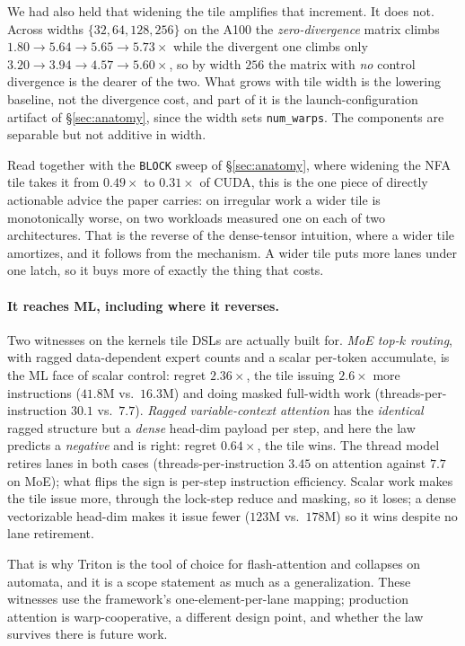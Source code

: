 \documentclass[sigplan,anonymous,review,nonacm,10pt]{acmart}
\begin{document}
We had also held that widening the tile amplifies that increment. It does not. Across
widths $\{32,64,128,256\}$ on the A100 the \emph{zero-divergence} matrix climbs
$1.80\rightarrow5.64\rightarrow5.65\rightarrow5.73\times$ while the divergent one climbs
only $3.20\rightarrow3.94\rightarrow4.57\rightarrow5.60\times$, so by width $256$ the
matrix with \emph{no} control divergence is the dearer of the two. What grows with tile
width is the lowering baseline, not the divergence cost, and part of it is the
launch-configuration artifact of \S\ref{sec:anatomy}, since the width sets
\texttt{num\_warps}. The components are separable but not additive in width.

Read together with the \texttt{BLOCK} sweep of \S\ref{sec:anatomy}, where widening the
NFA tile takes it from $0.49\times$ to $0.31\times$ of CUDA, this is the one piece of
directly actionable advice the paper carries: on irregular work a wider tile is
monotonically worse, on two workloads measured one on each of two architectures. That is the reverse of the
dense-tensor intuition, where a wider tile amortizes, and it follows from the mechanism.
A wider tile puts more lanes under one latch, so it buys more of exactly the thing that
costs.

\paragraph{It reaches ML, including where it reverses.} Two witnesses on the kernels tile
DSLs are actually built for. \emph{MoE top-$k$ routing}, with ragged data-dependent expert
counts and a scalar per-token accumulate, is the ML face of scalar control: regret
$2.36\times$, the tile issuing $2.6\times$ more instructions ($41.8$M vs.\ $16.3$M) and
doing masked full-width work (threads-per-instruction $30.1$ vs.\ $7.7$).
\emph{Ragged variable-context attention} has the \emph{identical} ragged structure but a
\emph{dense} head-dim payload per step, and here the law predicts a \emph{negative} and is
right: regret $0.64\times$, the tile wins. The thread model retires lanes in both cases
(threads-per-instruction $3.45$ on attention against $7.7$ on MoE); what flips the sign is
per-step instruction efficiency. Scalar work makes the tile issue
more, through the lock-step reduce and masking, so it loses; a dense vectorizable head-dim
makes it issue fewer ($123$M vs.\ $178$M) so it wins despite no lane retirement.

That is why Triton is the tool of choice for flash-attention and collapses on automata, and
it is a scope statement as much as a generalization. These witnesses use the framework's
one-element-per-lane mapping; production attention is warp-cooperative, a different design
point, and whether the law survives there is future work.
\end{document}
